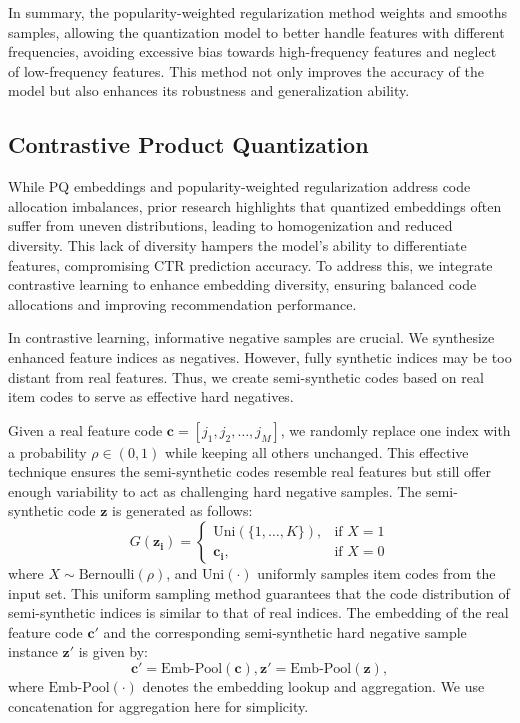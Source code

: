         In summary, the popularity-weighted regularization method weights and smooths samples, allowing the quantization model to better handle features with different frequencies, avoiding excessive bias towards high-frequency features and neglect of low-frequency features. This method not only improves the accuracy of the model but also enhances its robustness and generalization ability.
        
    \subsection{Contrastive Product Quantization}
        \label{subsec:cons}
        
        While PQ embeddings and popularity-weighted regularization address code allocation imbalances, prior research \cite{letter} highlights that quantized embeddings often suffer from uneven distributions, leading to homogenization and reduced diversity.
        This lack of diversity hampers the model's ability to differentiate features, compromising CTR prediction accuracy. To address this, we integrate contrastive learning to enhance embedding diversity, ensuring balanced code allocations and improving recommendation performance.
        
        In contrastive learning, informative negative samples are crucial. We synthesize enhanced feature indices as negatives. However, fully synthetic indices may be too distant from real features. Thus, we create semi-synthetic codes based on real item codes to serve as effective hard negatives.
        
        Given a real feature code $\mathbf{c} = [j_1, j_2, \ldots, j_M]$, we randomly replace one index with a probability $\rho \in (0, 1)$ while keeping all others unchanged. This effective technique ensures the semi-synthetic codes resemble real features but still offer enough variability to act as challenging hard negative samples. The semi-synthetic code $\mathbf{z}$ is generated as follows:
        \begin{equation}
        G(\mathbf{z_i}) = 
        \begin{cases} 
        \text{Uni}(\{1, \ldots, K\}), & \text{if } X = 1 \\
        \mathbf{c_i}, & \text{if } X = 0
        \end{cases}
        \end{equation}
        where $X \sim \text{Bernoulli}(\rho)$, and $\text{Uni}(\cdot)$ uniformly samples item codes from the input set. This uniform sampling method guarantees that the code distribution of semi-synthetic indices is similar to that of real indices. The embedding of the real feature code $\mathbf{c}'$ and the corresponding semi-synthetic hard negative sample instance $\mathbf{z}'$ is given by:
        \begin{equation}
        \mathbf{c}' = \text{Emb-Pool}(\mathbf{c}), \mathbf{z}' = \text{Emb-Pool}(\mathbf{z}),
        \end{equation}
        where $\text{Emb-Pool}(\cdot)$ denotes the embedding lookup and aggregation. We use concatenation for aggregation here for simplicity.
    
